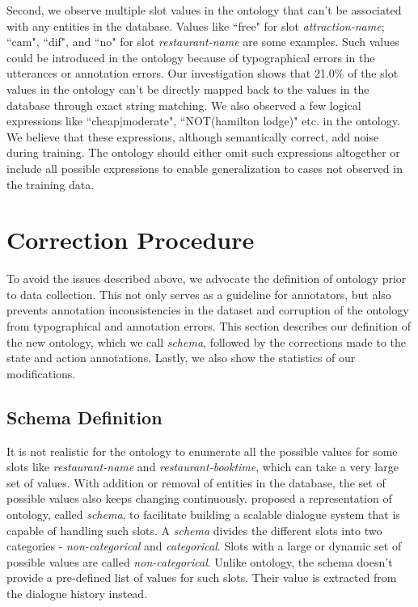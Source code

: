 Second, we observe multiple slot values in the ontology that can't be associated with any entities in the database. Values like ``free" for slot \textit{attraction-name}; ``cam", ``dif", and ``no" for slot \textit{restaurant-name} are some examples. Such values could be introduced in the ontology because of typographical errors in the utterances or annotation errors. Our investigation shows that 21.0\% of the slot values in the ontology can't be directly mapped back to the values in the database through exact string matching. We also observed a few logical expressions like ``cheap$|$moderate", ``NOT(hamilton lodge)" etc. in the ontology. We believe that these expressions, although semantically correct, add noise during training. The ontology should either omit such expressions altogether or include all possible expressions to enable generalization to cases not observed in the training data.

\section{Correction Procedure}
\label{sec:correction}

To avoid the issues described above, we advocate the definition of ontology prior to data collection. This not only serves as a guideline for annotators, but also prevents annotation inconsistencies in the dataset and corruption of the ontology from typographical and annotation errors. This section describes our definition of the new ontology, which we call \textit{schema}, followed by the corrections made to the state and action annotations. Lastly, we also show the statistics of our modifications.

\subsection{Schema Definition}
It is not realistic for the ontology to enumerate all the possible values for some slots like \textit{restaurant-name} and \textit{restaurant-booktime}, which can take a very large set of values. With addition or removal of entities in the database, the set of possible values also keeps changing continuously. \citet{rastogi2019scalable} proposed a representation of ontology, called \textit{schema}, to facilitate building a scalable dialogue system that is capable of handling such slots. A \textit{schema} divides the different slots into two categories - \textit{non-categorical} and \textit{categorical}. Slots with a large or dynamic set of possible values are called \textit{non-categorical}. Unlike ontology, the schema doesn't provide a pre-defined list of values for such slots. Their value is extracted from the dialogue history instead.

